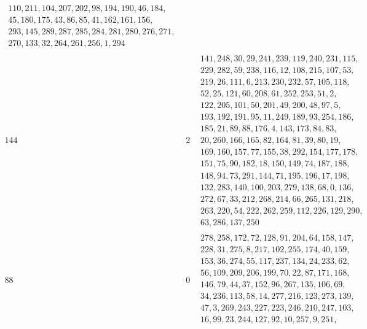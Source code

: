 \documentclass{article}
\begin{document}
{$$\begin{array}{|r|r|l|}
\begin{array}{l}
110, 211, 104, 207, 202, 98, 194, 190, 46, 184, \\
45, 180, 175, 43, 86, 85, 41, 162, 161, 156, \\
293, 145, 289, 287, 285, 284, 281, 280, 276, 271, \\
270, 133, 32, 264, 261, 256, 1, 294\end{array}
\\
\hline
\hline
144 & 2 & \begin{array}{l}
141, 248, 30, 29, 241, 239, 119, 240, 231, 115, \\
229, 282, 59, 238, 116, 12, 108, 215, 107, 53, \\
219, 26, 111, 6, 213, 230, 232, 57, 105, 118, \\
52, 25, 121, 60, 208, 61, 252, 253, 51, 2, \\
122, 205, 101, 50, 201, 49, 200, 48, 97, 5, \\
193, 192, 191, 95, 11, 249, 189, 93, 254, 186, \\
185, 21, 89, 88, 176, 4, 143, 173, 84, 83, \\
20, 260, 166, 165, 82, 164, 81, 39, 80, 19, \\
169, 160, 157, 77, 155, 38, 292, 154, 177, 178, \\
151, 75, 90, 182, 18, 150, 149, 74, 187, 188, \\
148, 94, 73, 291, 144, 71, 195, 196, 17, 198, \\
132, 283, 140, 100, 203, 279, 138, 68, 0, 136, \\
272, 67, 33, 212, 268, 214, 66, 265, 131, 218, \\
263, 220, 54, 222, 262, 259, 112, 226, 129, 290, \\
63, 286, 137, 250\end{array}
\\
\hline
\hline
88 & 0 & \begin{array}{l}
278, 258, 172, 72, 128, 91, 204, 64, 158, 147, \\
228, 31, 275, 8, 217, 102, 255, 174, 40, 159, \\
153, 36, 274, 55, 117, 237, 134, 24, 233, 62, \\
56, 109, 209, 206, 199, 70, 22, 87, 171, 168, \\
146, 79, 44, 37, 152, 96, 267, 135, 106, 69, \\
34, 236, 113, 58, 14, 277, 216, 123, 273, 139, \\
47, 3, 269, 243, 227, 223, 246, 210, 247, 103, \\
16, 99, 23, 244, 127, 92, 10, 257, 9, 251, \\

\end{array}
\end{array}$$}
\end{document}
